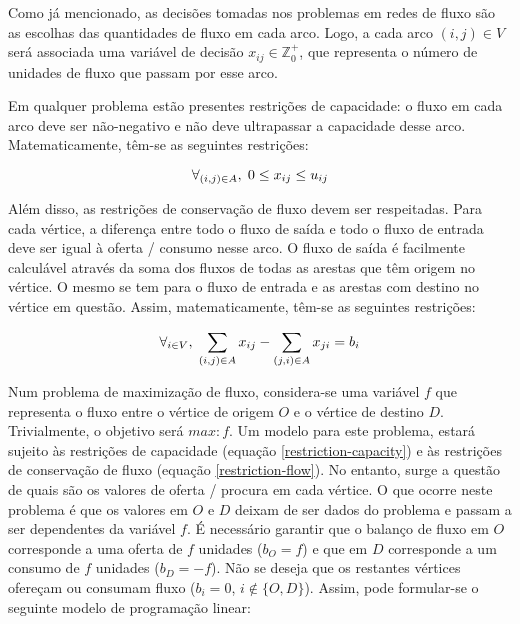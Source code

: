 \documentclass[12pt, a4paper, titlepage]{article}
\begin{document}
Como já mencionado, as decisões tomadas nos problemas em redes de fluxo são as escolhas das
quantidades de fluxo em cada arco. Logo, a cada arco $(i, j) \in V$ será associada uma variável de
decisão $x_{i j} \in \mathbb{Z}_0^+$, que representa o número de unidades de fluxo que passam por
esse arco.

Em qualquer problema estão presentes restrições de capacidade: o fluxo em cada arco deve ser
não-negativo e não deve ultrapassar a capacidade desse arco. Matematicamente, têm-se as seguintes
restrições:

\begin{equation}
    \label{restriction-capacity}
    \forall_{(i, j) \in A}, \hspace{1mm} 0 \le x_{i j} \le u_{i j}
\end{equation}

Além disso, as restrições de conservação de fluxo devem ser respeitadas. Para cada vértice, a
diferença entre todo o fluxo de saída e todo o fluxo de entrada deve ser igual à oferta / consumo
nesse arco. O fluxo de saída é facilmente calculável através da soma dos fluxos de todas as arestas
que têm origem no vértice. O mesmo se tem para o fluxo de entrada e as arestas com destino no
vértice em questão. Assim, matematicamente, têm-se as seguintes restrições:

\begin{equation}
    \label{restriction-flow}
    \forall_{i \in V}, \hspace{1mm} \sum_{(i, j) \in A} x_{i j} - \sum_{(j, i) \in A} x_{j i} = b_i
\end{equation}

Num problema de maximização de fluxo, considera-se uma variável $f$ que representa o fluxo entre
o vértice de origem $O$ e o vértice de destino $D$. Trivialmente, o objetivo será $max: f$. Um
modelo para este problema, estará sujeito às restrições de capacidade (equação
\ref{restriction-capacity}) e às restrições de conservação de fluxo (equação
\ref{restriction-flow}). No entanto, surge a questão de quais são os valores de oferta / procura em
cada vértice. O que ocorre neste problema é que os valores em $O$ e $D$ deixam de ser dados do
problema e passam a ser dependentes da variável $f$. É necessário garantir que o balanço de fluxo em
$O$ corresponde a uma oferta de $f$ unidades ($b_O = f$) e que em $D$ corresponde a um consumo de
$f$ unidades ($b_D = -f$). Não se deseja que os restantes vértices ofereçam ou consumam fluxo
($b_i = 0$, $i \not \in \{O, D\}$). Assim, pode formular-se o seguinte modelo de programação linear:
\end{document}
